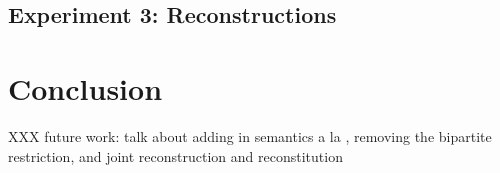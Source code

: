 \documentclass[11pt,a4paper]{article}
\begin{document}
\subsection{Experiment 3: Reconstructions}

\section{Conclusion}

XXX future work: talk about adding in semantics a la , removing the
bipartite restriction, and joint reconstruction and reconstitution


\end{document}
